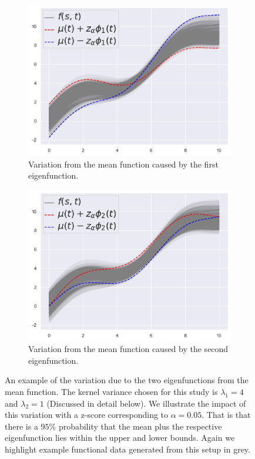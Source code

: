 \begin{figure}
	\centering
	\begin{subfigure}[b]{0.45\textwidth}
		\includegraphics[width=\textwidth]{sim_eig_1}
		\caption{Variation from the mean function caused by the first eigenfunction.}
		\label{fig:sim_eig1}
	\end{subfigure}
	\hfill        
	\begin{subfigure}[b]{0.45\textwidth}
		\includegraphics[width=\textwidth]{sim_eig_2}
		\caption{Variation from the mean function caused by the second eigenfunction.}
		\label{fig:sim_eig2}
	\end{subfigure}
	\caption[An example of the variation due to the two eigenfunctions from the mean function. ]{An example of the variation due to the two eigenfunctions from the mean function. The kernel variance chosen for this study is $\lambda_1 = 4$ and $\lambda_2 = 1$ (Discussed in detail below). We illustrate the impact of this variation with a z-score corresponding to $\alpha=0.05$.  That is that there is a $95 \%$ probability that the mean plus the respective eigenfunction lies within the upper and lower bounds. Again we highlight example functional data generated from this setup in grey.}
	\label{fig:sim_eig}
\end{figure}

